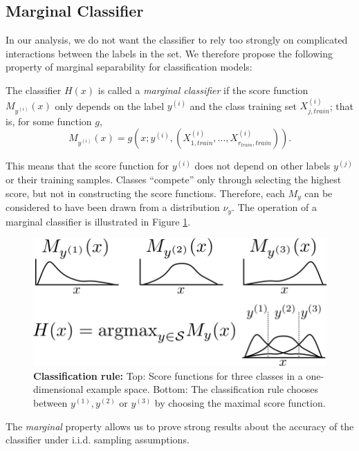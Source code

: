 \documentclass[twoside,11pt]{article}
\begin{document}
\subsection{Marginal Classifier}

In our analysis, we do not want the classifier to rely too strongly on
complicated interactions between the labels in the set. We therefore
propose the following property of marginal separability for
classification models:

\begin{definition}
The classifier $H(x)$ is called a \emph{marginal classifier} if the
score function $M_{y^{(i)}}(x)$ only depends on the label $y^{(i)}$
and the class training set $X_{j, train}^{(i)}$; that is, for some function $g$,
\[M_{y^{(i)}}(x) = g(x; y^{(i)},(X_{1, train}^{(i)},...,X_{r_{train}, train}^{(i)})).\]
\end{definition}
This means that the score function for $y^{(i)}$ does not depend on
other labels $y^{(j)}$ or their training samples.  Classes ``compete'' only through selecting the highest
score, but not in constructing the score functions.  
Therefore, each
$M_y$ can be considered to have been drawn from a distribution
$\nu_y$.  
The operation of
a marginal classifier is illustrated in Figure
\ref{fig:classification_rule}.


\begin{figure}[t]
\centering
\includegraphics[scale = 0.4]{classification_rule.png}
\caption{\textbf{Classification rule:} Top: Score functions for three classes in a one-dimensional example space. Bottom: The classification rule chooses between $y^{(1)},y^{(2)}$ or $y^{(3)}$ by choosing the maximal score function. 
}
\label{fig:classification_rule}
\end{figure}

The \emph{marginal} property allows us to prove
strong results about the accuracy of the classifier under
i.i.d. sampling assumptions.
\end{document}
